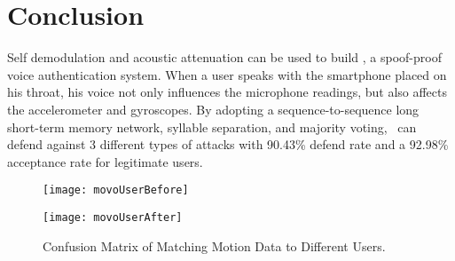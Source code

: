 \section{Conclusion}

Self demodulation and acoustic attenuation can be used to build {\shortname}, a spoof-proof voice authentication system. When a user speaks with the smartphone placed on his throat, his voice not only influences the microphone readings, but also affects the accelerometer and gyroscopes. By adopting a sequence-to-sequence long short-term memory network, syllable separation, and majority voting, \shortname~can defend against 3 different types of attacks with 90.43\% defend rate and a 92.98\% acceptance rate for legitimate users.




\begin{landscape}
	\begin{figure}[h]
		\centering
		\begin{minipage}{.48\linewidth}
			\texttt{[image: movoUserBefore]}
			\label{fig:usermata}
			\vspace{.05in}
		\end{minipage}
		\begin{minipage}{.48\linewidth}
			\texttt{[image: movoUserAfter]}
			\label{fig:usermatb}
			\vspace{.05in}
		\end{minipage}
		\caption{Confusion Matrix of Matching Motion Data to Different Users.}
		\label{fig:usermat}
	\end{figure}
\end{landscape}